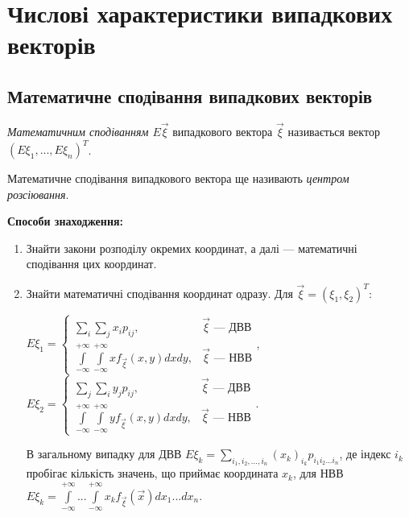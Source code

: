 \section{Числові характеристики випадкових векторів}

\subsection{Математичне сподівання випадкових векторів}
\begin{definition}
    \emph{Математичним сподіванням $E{\vec{\xi}}$} 
    випадкового вектора $\vec{\xi}$ називається вектор 
    $\left(E{\xi_1}, ..., E{\xi_n}\right)^T$.
\end{definition}
\begin{remark}
    Математичне сподівання випадкового вектора ще називають
     \emph{центром розсіювання}.
\end{remark}

\noindent \textbf{Способи знаходження:}
\begin{enumerate}
    \item Знайти закони розподілу окремих координат, а далі --- математичні сподівання цих координат.
    \item Знайти математичні сподівання координат одразу.
    Для $\vec{\xi} = (\xi_1, \xi_2)^T$:
    
    $E\xi_1 = \begin{cases}
        \sum\limits_i \sum\limits_j x_i p_{ij}, & \vec{\xi} \text{ --- ДВВ} \\
        \int\limits_{-\infty}^{+\infty} \int\limits_{-\infty}^{+\infty} x f_{\vec{\xi}}(x,y) dx dy, & \vec{\xi} \text{ --- НВВ}
    \end{cases}$,
    $E\xi_2 = \begin{cases}
        \sum\limits_j \sum\limits_i y_j p_{ij}, & \vec{\xi} \text{ --- ДВВ} \\
        \int\limits_{-\infty}^{+\infty} \int\limits_{-\infty}^{+\infty} y f_{\vec{\xi}}(x,y) dx dy, & \vec{\xi} \text{ --- НВВ}
    \end{cases}$.
    
    В загальному випадку для ДВВ $E\xi_k = \sum\limits_{i_1, i_2, ..., i_n} (x_k)_{i_k} p_{i_1 i_2 ... i_n}$, де індекс $i_k$ пробігає кількість
    значень, що приймає координата $x_k$,
    для НВВ $E\xi_k = \int\limits_{-\infty}^{+\infty}...\int\limits_{-\infty}^{+\infty} x_k f_{\vec{\xi}}(\vec{x}) dx_1 ... dx_n$.
\end{enumerate}

